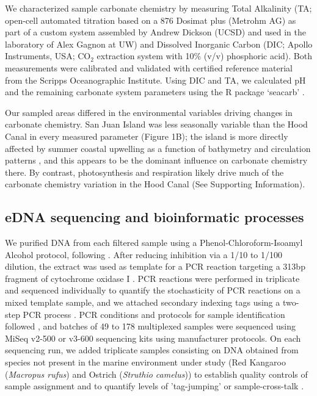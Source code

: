 \documentclass[11pt]{article}
\begin{document}
\begin{linenumbers}
We characterized sample carbonate chemistry by measuring Total Alkalinity (TA; open-cell automated titration based on a 876 Dosimat plus (Metrohm AG) as part of a custom system assembled by Andrew Dickson (UCSD) and used in the laboratory of Alex Gagnon at UW) and Dissolved Inorganic Carbon (DIC; Apollo Instruments, USA; CO$_2$ extraction system with 10\% (v/v) phosphoric acid). Both measurements were calibrated and validated with certified reference material from the Scripps Oceanographic Institute. Using DIC and TA, we calculated pH and the remaining carbonate system parameters using the R package `seacarb' \cite{seacarb}. 

Our sampled areas differed in the environmental variables driving changes in carbonate chemistry. San Juan Island was less seasonally variable than the Hood Canal in every measured parameter (Figure 1B); the island is more directly affected by summer coastal upwelling as a function of bathymetry and circulation patterns \cite{murray2015inland}, and this appears to be the dominant influence on carbonate chemistry there. By contrast, photosynthesis and respiration likely drive much of the carbonate chemistry variation in the Hood Canal (See Supporting Information). 

\subsection*{eDNA sequencing and bioinformatic processes}
We purified DNA from each filtered sample using a Phenol-Chloroform-Isoamyl Alcohol protocol, following \cite{renshaw2015room}.  After reducing inhibition via a 1/10 to 1/100 dilution, the extract was used as template for a PCR reaction targeting a 313bp fragment of cytochrome oxidase I \cite{leray_new_2013}. PCR reactions were performed in triplicate and sequenced individually to quantify the stochasticity of PCR reactions on a mixed template sample, and we attached secondary indexing tags using a two-step PCR process \cite{odonnellPrimers}. PCR conditions and protocols for sample identification followed \cite{kelly2018tides}, and batches of 49 to 178 multiplexed samples were sequenced using MiSeq v2-500 or v3-600 sequencing kits using manufacturer protocols. On each sequencing run, we added triplicate samples consisting on DNA obtained from species not present in the marine environment under study (Red Kangaroo (\textit{Macropus rufus}) and Ostrich (\textit{Struthio camelus})) to establish quality controls of sample assignment and to quantify levels of 'tag-jumping' or sample-cross-talk \cite{schnell2015tag}. 


\end{linenumbers}
\end{document}
